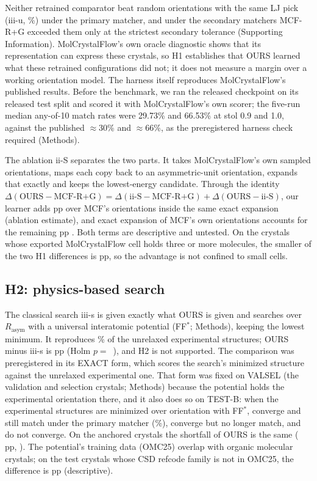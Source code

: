 \documentclass[journal=acsodf,manuscript=article]{achemso}
\begin{document}
Neither retrained comparator beat random orientations with the same LJ pick (iii-u,
\nHaarPick\%) under the primary matcher, and under the secondary matchers MCF-R+G exceeded
them only at the strictest secondary tolerance (Supporting Information). MolCrystalFlow's own
oracle diagnostic shows that its representation can express these crystals, so H1
establishes that OURS learned what these retrained configurations did not; it does not
measure a margin over a working orientation model. The harness itself reproduces
MolCrystalFlow's published results. Before the benchmark, we ran the released checkpoint on
its released test split and scored it with MolCrystalFlow's own scorer; the five-run median
any-of-10 match rates were 29.73\% and 66.53\% at stol 0.9 and 1.0, against the published
$\approx$30\% and $\approx$66\%, as the preregistered harness check required (Methods).

The ablation ii-S separates the two parts. It takes MolCrystalFlow's own sampled
orientations, maps each copy back to an asymmetric-unit orientation, expands that exactly
and keeps the lowest-energy candidate. Through the identity
$\Delta(\text{OURS}-\text{MCF-R+G})=\Delta(\text{ii-S}-\text{MCF-R+G})+\Delta(\text{OURS}-\text{ii-S})$,
our learner adds \nLearnDelta{} pp \nLearnCI{} over MCF's orientations inside the same exact
expansion (ablation estimate), and exact expansion of MCF's own orientations accounts for the
remaining \nExpDelta{} pp \nExpCI. Both terms are descriptive and untested. On the crystals
whose exported MolCrystalFlow cell holds three or more molecules, the smaller of the two H1
differences is \nZmcfMin{} pp, so the advantage is not confined to small cells.

\subsection{H2: physics-based search}
The classical search iii-s is given exactly what OURS is given and searches over
$R_{\text{asym}}$ with a universal interatomic potential (FF$^\ast$; Methods), keeping the
lowest minimum. It reproduces \nSearchPick\% of the unrelaxed experimental structures;
OURS minus iii-s is \nHTwoDelta{} pp \nHTwoCI{} (Holm $p=$~\nHTwoP), and H2 is not
supported. The comparison was preregistered in its EXACT form, which scores the search's
minimized structure against the unrelaxed experimental one. That form was fixed on VALSEL
(the validation and selection crystals; Methods) because the potential holds the
experimental orientation there, and it also does so on TEST-B: when the experimental
structures are minimized over orientation with FF$^\ast$, \nFFAnchN{} converge and still
match under the primary matcher (\nAnchPct\%), \nFFDriftN{} converge but no longer match,
and \nFFUnresN{} do not converge. On the anchored crystals the shortfall of OURS is the same
(\nAnchDelta{} pp, \nAnchCI). The potential's training data (OMC25) overlap with organic
molecular crystals; on the \nOmcN{} test crystals whose CSD refcode family is not in OMC25,
the difference is \nOmcDelta{} pp \nOmcCI{} (descriptive).
\end{document}
